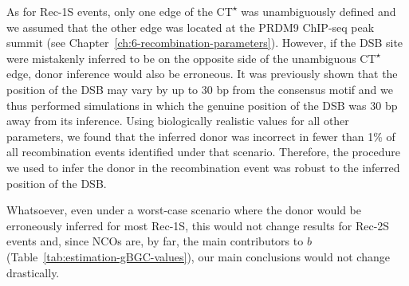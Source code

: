 As for Rec-1S events, only one edge of the CT\textsuperscript{$\star$} was unambiguously defined and we assumed that the other edge was located at the PRDM9 ChIP-seq peak summit (see Chapter~\ref{ch:6-recombination-parameters}).
However, if the DSB site were mistakenly inferred to be on the opposite side of the unambiguous CT\textsuperscript{$\star$} edge, donor inference would also be erroneous.
It was previously shown that the position of the DSB may vary by up to 30 bp from the consensus motif \citep{lange2016landscape} and we thus performed simulations in which the genuine position of the DSB was 30 bp away from its inference. 
Using biologically realistic values for all other parameters, we found that the inferred donor was incorrect in fewer than 1\% of all recombination events identified under that scenario. 
Therefore, the procedure we used to infer the donor in the recombination event was robust to the inferred position of the DSB\@.

Whatsoever, even under a worst-case scenario where the donor would be erroneously inferred for most Rec-1S, this would not change results for Rec-2S events and, since NCOs are, by far, the main contributors to $b$ (Table~\ref{tab:estimation-gBGC-values}), our main conclusions would not change drastically.









